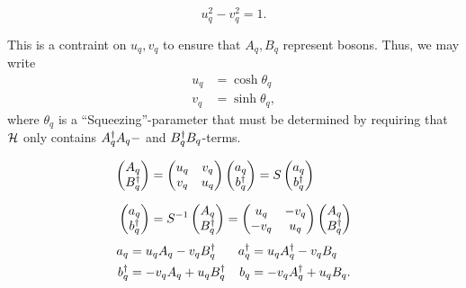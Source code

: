 \begin{tcolorbox}
	\begin{equation}
		 u_{q}^2-v_{q}^{2} = 1.
	\end{equation}
\end{tcolorbox}
This is a contraint on $u_{q}, v_{q}$ to ensure that $A_{q}, B_{q}$ represent bosons. Thus, we may write
\begin{align}
	u_{q} &= \cosh\theta_{q} \\
	v_{q} &= \sinh\theta_{q},
\end{align}
where
$\theta_{q}$ is a ``Squeezing''-parameter that must be determined by requiring that $\mathcal{H}$ only contains $A_{q}^{\dagger}A_{q}-$ and $B_{q}^{\dagger}B_{q}$-terms. 

\begin{align}
	\begin{pmatrix}
		A_{q} \\ B_{q}^{\dagger}
	\end{pmatrix} &= \begin{pmatrix}
	u_{q} & v_{q} \\ v_{q} & u_{q}
\end{pmatrix}\begin{pmatrix}
a_{q} \\ b_{q}^{\dagger}
\end{pmatrix} = S\begin{pmatrix}
a_{q} \\ b_{q}^{\dagger}
\end{pmatrix} \\[1.5ex]
\begin{pmatrix}
	a_{q} \\ b_{q}^{\dagger}
\end{pmatrix} &= S^{-1}\begin{pmatrix}
A_{q} \\ B_{q}^{\dagger}
\end{pmatrix} = \begin{pmatrix}
u_{q} & -v_{q} \\ -v_{q} & u_{q}
\end{pmatrix}\begin{pmatrix}
A_{q} \\ B_{q}^{\dagger}
\end{pmatrix}
\end{align}
\begin{align}
	a_{q} &= u_{q}A_{q}-v_{q}B_{q}^{\dagger} & a_{q}^{\dagger} &= u_{q}A_{q}^{\dagger}-v_{q}B_{q} \\
	b_{q}^{\dagger} &= -v_{q}A_{q} + u_{q}B_{q}^{\dagger} & b_{q} &= -v_{q}A_{q}^{\dagger} + u_{q}B_{q}.
\end{align}
